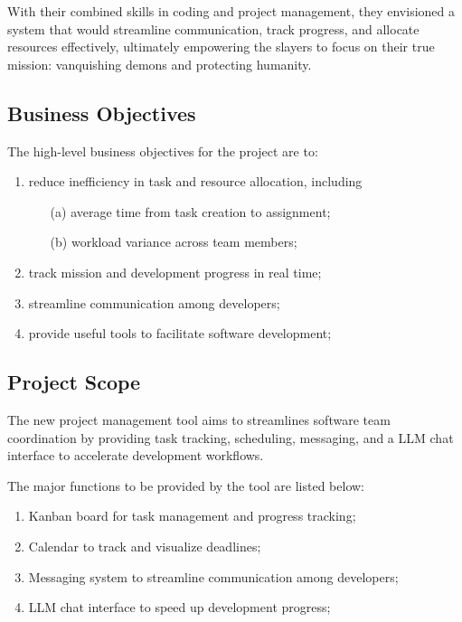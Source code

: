\documentclass[11pt]{article}
\begin{document}
With their combined skills in coding and project management, they envisioned a system that
would streamline communication, track progress, and allocate resources effectively, ultimately
empowering the slayers to focus on their true mission: vanquishing demons and protecting
humanity.

\subsection{Business Objectives}
The high-level business objectives for the project are to:
\begin{enumerate}
    \item reduce inefficiency in task and resource allocation, including
    \begin{itemize}%
        \item[(a)] average time from task creation to assignment;
        \item[(b)] workload variance across team members;
    \end{itemize}
    \item track mission and development progress in real time;
    \item streamline communication among developers;
    \item provide useful tools to facilitate software development;
\end{enumerate}

\subsection{Project Scope}
The new project management tool aims to streamlines software team coordination by 
providing task tracking, scheduling, messaging, and a LLM chat interface to accelerate
development workflows.

The major functions to be provided by the tool are listed below:
\begin{enumerate}
    \item Kanban board for task management and progress tracking;
    \item Calendar to track and visualize deadlines;
    \item Messaging system to streamline communication among developers;
    \item LLM chat interface to speed up development progress;
\end{enumerate}

\end{document}
